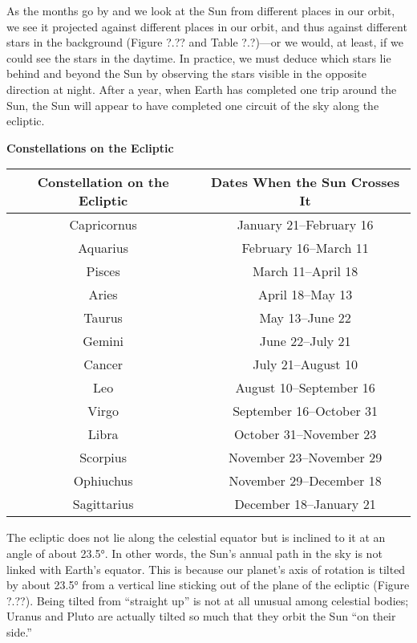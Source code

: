 \documentclass[main.tex]{subfiles}
\begin{document}
\vspace{1em}

As the months go by and we look at the Sun from different places in our orbit, we see it projected against different places in our orbit, and thus against different stars in the background (Figure ?.?? and Table ?.?)---or we would, at least, if we could see the stars in the daytime. In practice, we must deduce which stars lie behind and beyond the Sun by observing the stars visible in the opposite direction at night. After a year, when Earth has completed one trip around the Sun, the Sun will appear to have completed one circuit of the sky along the ecliptic.


\vspace{1em}

\begin{center}
\textbf{Constellations on the Ecliptic}
    \begin{tabular}{c|c}
        \textbf{Constellation on the Ecliptic} & \textbf{Dates When the Sun Crosses It}\\
        \hline
        Capricornus	& January 21--February 16\\
        Aquarius & February 16--March 11\\
        Pisces & March 11--April 18\\
        Aries & April 18--May 13\\
        Taurus & May 13--June 22\\
        Gemini & June 22--July 21\\
        Cancer & July 21--August 10\\
        Leo & August 10--September 16\\
        Virgo & September 16--October 31\\
        Libra & October 31--November 23\\
        Scorpius & November 23--November 29\\
        Ophiuchus & November 29--December 18\\
        Sagittarius & December 18--January 21\\
        \hline
    \end{tabular}
\end{center}

The ecliptic does not lie along the celestial equator but is inclined to it at an angle of about \ang{23.5}. In other words, the Sun's annual path in the sky is not linked with Earth's equator. This is because our planet's axis of rotation is tilted by about \ang{23.5} from a vertical line sticking out of the plane of the ecliptic (Figure ?.??). Being tilted from ``straight up'' is not at all unusual among celestial bodies; Uranus and Pluto are actually tilted so much that they orbit the Sun ``on their side.''
\end{document}
